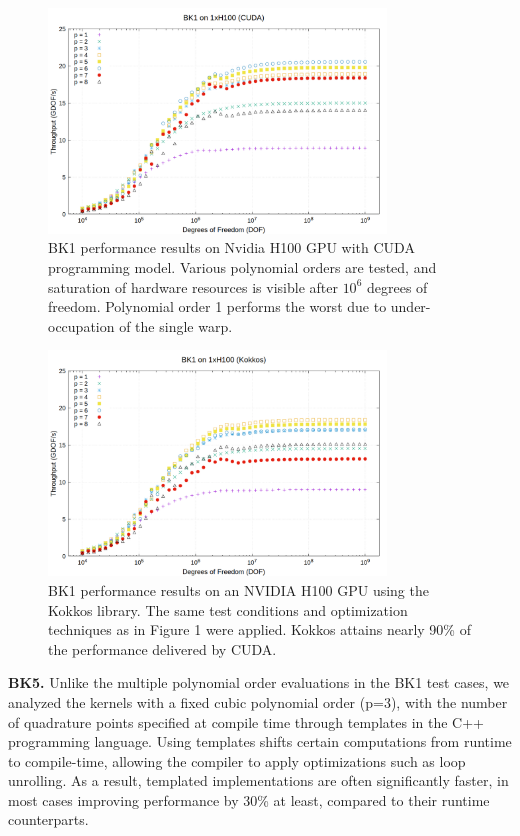 \documentclass[a4paper,12pt]{article}
\begin{document}
\begin{figure}
\centering
\includegraphics[width=0.8\textwidth]{BK1_1}
\caption{BK1 performance results on Nvidia H100 GPU with CUDA programming model. Various polynomial orders are tested, and saturation of hardware resources is visible after $10^6$ degrees of freedom. Polynomial order 1 performs the worst due to under-occupation of the single warp.}\label{fig:BK1_1}
\end{figure}
\begin{figure}
\centering
\includegraphics[width=0.8\textwidth]{BK1_2}
\caption{BK1 performance results on an NVIDIA H100 GPU using the Kokkos library. The same test conditions and optimization techniques as in Figure 1 were applied. Kokkos attains nearly 90\% of the performance delivered by CUDA.}
\label{fig:BK1_2}
\end{figure}

{\bf BK5.} Unlike the multiple polynomial order evaluations in the BK1 test cases, we analyzed the kernels with a fixed cubic polynomial order (p=3), with the number of quadrature points specified at compile time through templates in the C++ programming language. Using templates shifts certain computations from runtime to compile-time, allowing the compiler to apply optimizations such as loop unrolling. As a result, templated implementations are often significantly faster, in most cases improving performance by 30\% at least, compared to their runtime counterparts.
\end{document}
